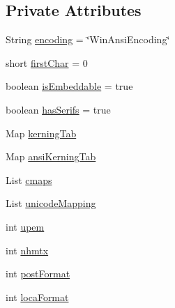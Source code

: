 \subsection*{Private Attributes}
\begin{DoxyCompactItemize}
\item 
String \mbox{\hyperlink{classorg_1_1newdawn_1_1slick_1_1tools_1_1hiero_1_1truetype_1_1_t_t_f_file_ada971c372026e4ee9a517b9566959715}{encoding}} = \char`\"{}Win\+Ansi\+Encoding\char`\"{}
\item 
short \mbox{\hyperlink{classorg_1_1newdawn_1_1slick_1_1tools_1_1hiero_1_1truetype_1_1_t_t_f_file_a9c9745ebee1ce7df4065a344b8da40c5}{first\+Char}} = 0
\item 
boolean \mbox{\hyperlink{classorg_1_1newdawn_1_1slick_1_1tools_1_1hiero_1_1truetype_1_1_t_t_f_file_ad7cec56756fe6333ad4b0d18622dc241}{is\+Embeddable}} = true
\item 
boolean \mbox{\hyperlink{classorg_1_1newdawn_1_1slick_1_1tools_1_1hiero_1_1truetype_1_1_t_t_f_file_a6a7d6badaedf94e5014891ccc59cf319}{has\+Serifs}} = true
\item 
Map \mbox{\hyperlink{classorg_1_1newdawn_1_1slick_1_1tools_1_1hiero_1_1truetype_1_1_t_t_f_file_aff91f31cbfd733d87daa89435a5245fd}{kerning\+Tab}}
\item 
Map \mbox{\hyperlink{classorg_1_1newdawn_1_1slick_1_1tools_1_1hiero_1_1truetype_1_1_t_t_f_file_ac4b9a9e2d782475f624524e45411a0c3}{ansi\+Kerning\+Tab}}
\item 
List \mbox{\hyperlink{classorg_1_1newdawn_1_1slick_1_1tools_1_1hiero_1_1truetype_1_1_t_t_f_file_a2485473f90e9a1361c892560e662d156}{cmaps}}
\item 
List \mbox{\hyperlink{classorg_1_1newdawn_1_1slick_1_1tools_1_1hiero_1_1truetype_1_1_t_t_f_file_a2c9280bb8fa734f8deb6de981a0b4fea}{unicode\+Mapping}}
\item 
int \mbox{\hyperlink{classorg_1_1newdawn_1_1slick_1_1tools_1_1hiero_1_1truetype_1_1_t_t_f_file_a8250ffa3465ce98f553e94c1dec0287f}{upem}}
\item 
int \mbox{\hyperlink{classorg_1_1newdawn_1_1slick_1_1tools_1_1hiero_1_1truetype_1_1_t_t_f_file_a023a76960a7afade999879f6e2e63ed2}{nhmtx}}
\item 
int \mbox{\hyperlink{classorg_1_1newdawn_1_1slick_1_1tools_1_1hiero_1_1truetype_1_1_t_t_f_file_a74432069019de8caa2e155cc2f173631}{post\+Format}}
\item 
int \mbox{\hyperlink{classorg_1_1newdawn_1_1slick_1_1tools_1_1hiero_1_1truetype_1_1_t_t_f_file_a3b126feb637031a850bb264952485534}{loca\+Format}}

\end{DoxyCompactItemize}
